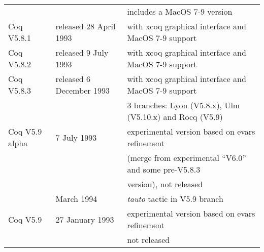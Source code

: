 \documentclass[a4paper]{book}
\newcommand{\feature}[1]{{\em #1}}
\begin{document}
\begin{tabular}{l|l|l}
& & includes a MacOS 7-9 version\\

Coq V5.8.1& released 28 April 1993 & with xcoq graphical interface and MacOS 7-9 support\\

Coq V5.8.2& released 9 July 1993 & with xcoq graphical interface and MacOS 7-9 support\\

Coq V5.8.3& released 6 December 1993 %
          & with xcoq graphical interface and MacOS 7-9 support\\

 & & 3 branches: Lyon (V5.8.x), Ulm (V5.10.x) and Rocq (V5.9)\\

Coq V5.9 alpha& 7 July 1993 &
experimental version based on evars refinement \\
              & & (merge from experimental ``V6.0'' and some pre-V5.8.3 \\
              & & version), not released\\

& March 1994 & \feature{tauto} tactic in V5.9 branch\\

Coq V5.9 & 27 January 1993 & experimental version based on evars refinement\\
         & & not released\\
\end{tabular}

\bigskip
\bigskip


\newpage
\end{document}
